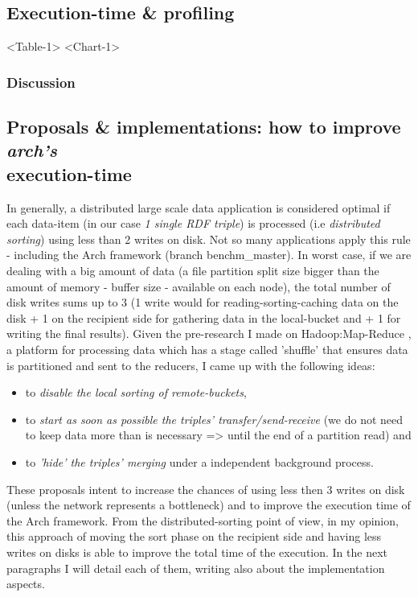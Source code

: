 \pagebreak

% 
\subsection{Execution-time \& profiling}

<Table-1>
<Chart-1>

% 
\subsubsection*{Discussion}

% 
\subsection{Proposals \& implementations: how to improve \textit{arch's} \\ execution-time}

In generally, a distributed large scale data application is considered optimal if each data-item (in our case \textit{1 single RDF triple}) is processed (i.e \textit{distributed sorting}) using less than 2 writes on disk. Not so many applications apply this rule - including the Arch framework (branch benchm_master). In worst case, if we are dealing with a big amount of data (a file partition split size bigger than the amount of memory - buffer size - available on each node), the total number of disk writes sums up to 3 (1 write would for reading-sorting-caching data on the disk + 1 on the recipient side for gathering data in the local-bucket and + 1 for writing the final results). Given the pre-research I made on Hadoop:Map-Reduce \cite{hadoop}, a platform for processing data which has a stage called 'shuffle' \cite{shuffling} that ensures data is partitioned and sent to the reducers, I came up with the following ideas: 
\begin{itemize}
\item to \textit{disable the local sorting of remote-buckets},
\item to \textit{start as soon as possible the triples' transfer/send-receive} (we do not need to keep data more than is necessary => until the end of a partition read) and
\item to \textit{'hide' the triples' merging} under a independent background process. 
\end{itemize}
  
These proposals intent to increase the chances of using less then 3 writes on disk (unless the network represents a bottleneck) and to improve the execution time of the Arch framework. From the distributed-sorting point of view, in my opinion, this approach of moving the sort phase on the recipient side and having less writes on disks is able to improve the total time of the execution. In the next paragraphs I will detail each of them, writing also about the implementation aspects.

